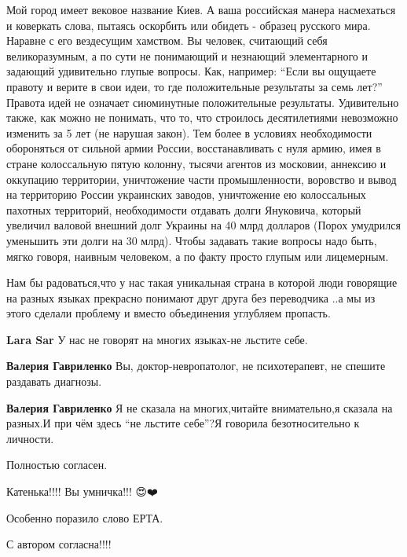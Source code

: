 \begin{itemize}
{\begin{itemize}
Мой город имеет вековое название Киев. А ваша российская манера насмехаться и
коверкать слова, пытаясь оскорбить или обидеть - образец русского мира. Наравне
с его вездесущим хамством. Вы человек, считающий себя великоразумным, а по сути
не понимающий и незнающий элементарного и задающий удивительно глупые вопросы.
Как, например: \enquote{Если вы ощущаете правоту и верите в свои идеи, то где
положительные результаты за семь лет?} Правота идей не означает сиюминутные
положительные результаты. Удивительно также, как можно не понимать, что то, что
строилось десятилетиями невозможно изменить за 5 лет (не нарушая закон). Тем
более в условиях необходимости обороняться от сильной армии России,
восстанавливать с нуля армию, имея в стране колоссальную пятую колонну, тысячи
агентов из московии, аннексию и оккупацию территории, уничтожение части
промышленности, воровство и вывод на территорию России украинских заводов,
уничтожение ею колоссальных пахотных территорий, необходимости отдавать долги
Януковича, который увеличил валовой внешний долг Украины на 40 млрд долларов
(Порох умудрился уменьшить эти долги на 30 млрд). Чтобы задавать такие вопросы
надо быть, мягко говоря, наивным человеком, а по факту просто глупым или
лицемерным.

\end{itemize}

Нам бы радоваться,что у нас такая уникальная страна в которой люди говорящие на разных языках прекрасно понимают друг друга без переводчика ..а мы из этого сделали проблему и вместо объединения углубляем пропасть.

\begin{itemize}
\textbf{Lara Sar} У нас не говорят на многих языках-не льстите себе.

\textbf{Валерия Гавриленко} Вы, доктор-невропатолог, не психотерапевт, не спешите раздавать диагнозы.

\textbf{Валерия Гавриленко} Я не сказала на многих,читайте внимательно,я сказала на разных.И при чём здесь \enquote{не льстите себе}?Я говорила безотносительно к личности.
\end{itemize}

Полностью согласен.

Катенька!!!! Вы умничка!!! 😍❤️🌹😘😘😘

Особенно поразило слово ЕРТА.

С автором согласна!!!!

}
\end{itemize}
